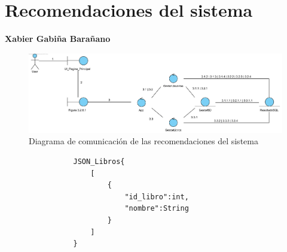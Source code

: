 ﻿\documentclass{report}
\begin{document}
        \section{Recomendaciones del sistema}
            \textbf{Xabier Gabiña Barañano}
            \begin{figure}[H]
                \centering
                \includegraphics[width=1.0\textwidth]{img/comunicacion/recomendacionesDelSistema.png}
                \caption{Diagrama de comunicación de las recomendaciones del sistema}
            \end{figure}
            \begin{verbatim}
                JSON_Libros{
                    [
                        {
                            "id_libro":int,
                            "nombre":String
                        }
                    ]
                }
            \end{verbatim}
            \clearpage
\end{document}
